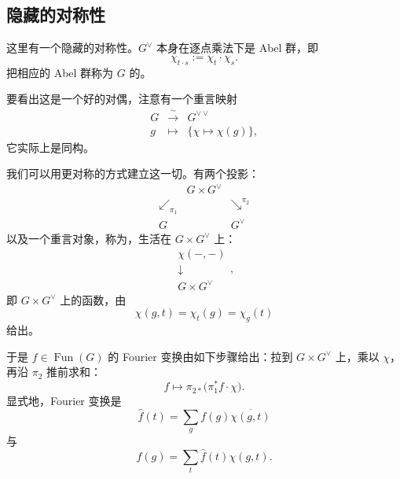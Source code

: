 \subsection{隐藏的对称性}

这里有一个隐藏的对称性。$G^{\vee}$ 本身在逐点乘法下是 Abel 群，即
\begin{equation}\tag{3.25}
\chi_{t\cdot s}:=\chi_t\cdot\chi_s.
\end{equation}
把相应的 Abel 群称为 $G$ 的。

要看出这是一个好的对偶，注意有一个重言映射
\begin{equation}\tag{3.26}
\begin{array}{ccc}
G & \xrightarrow{\ \sim\ } & G^{\vee\vee}\\[2pt]
g & \longmapsto & \{\chi\mapsto\chi(g)\},
\end{array}
\end{equation}
它实际上是同构。

我们可以用更对称的方式建立这一切。有两个投影：
\begin{equation}\tag{3.27}
\begin{array}{ccc}
& G\times G^{\vee} &\\
\swarrow_{\pi_1} & & \searrow^{\pi_2}\\
G & & G^{\vee}
\end{array}
\end{equation}
以及一个重言对象，称为，生活在 $G\times G^{\vee}$ 上：
\begin{equation}\tag{3.28}
\begin{array}{c}
\chi(-,-)\\[-2pt]
\downarrow\\[-2pt]
G\times G^{\vee}
\end{array},
\end{equation}
即 $G\times G^{\vee}$ 上的函数，由
\begin{equation}\tag{3.29}
\chi(g,t)=\chi_t(g)=\chi_g(t)
\end{equation}
给出。

于是 $f\in\operatorname{Fun}(G)$ 的 Fourier 变换由如下步骤给出：拉到 $G\times G^{\vee}$ 上，乘以 $\chi$，再沿 $\pi_2$ 推前求和：
\begin{equation}\tag{3.30}
f\mapsto\pi_{2*}\bigl(\pi_1^{*}f\cdot\chi\bigr).
\end{equation}
显式地，Fourier 变换是
\begin{equation}\tag{3.31}
\hat f(t)=\sum_g f(g)\overline{\chi(g,t)}
\end{equation}
与
\begin{equation}\tag{3.32}
f(g)=\sum_t\hat f(t)\chi(g,t).
\end{equation}

